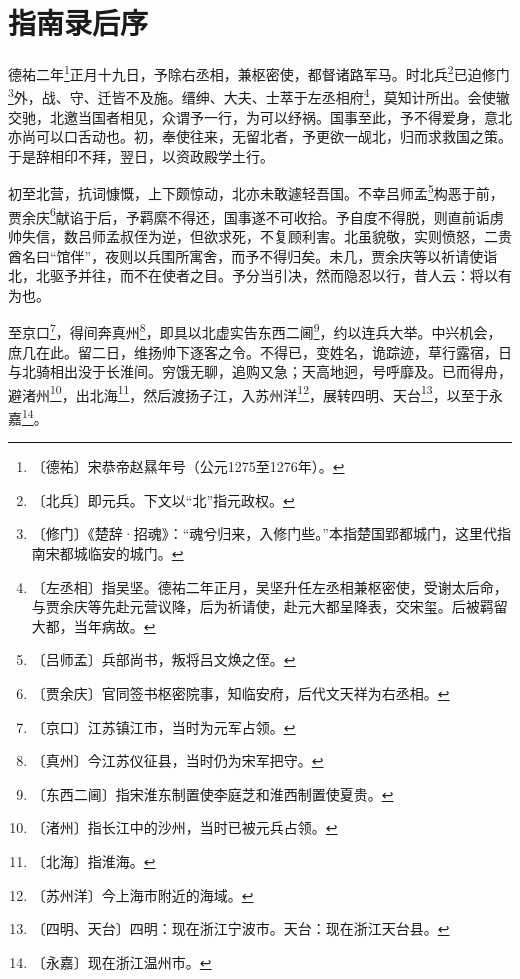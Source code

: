 \documentclass[12pt,UTF-8,openany]{ctexbook}
\begin{document}
\chapter{指南录后序}

\begin{normalsize}
    
    德祐二年\footnote{〔德祐〕宋恭帝赵㬎年号（公元1275至1276年）。}正月十九日，予除右丞相，兼枢密使，都督诸路军马。时北兵\footnote{〔北兵〕即元兵。下文以“北”指元政权。}已迫修门\footnote{〔修门〕《楚辞·招魂》：“魂兮归来，入修门些。”本指楚国郢都城门，这里代指南宋都城临安的城门。}外，战、守、迁皆不及施。缙绅、大夫、士萃于左丞相府\footnote{〔左丞相〕指吴坚。德祐二年正月，吴坚升任左丞相兼枢密使，受谢太后命，与贾余庆等先赴元营议降，后为祈请使，赴元大都呈降表，交宋玺。后被羁留大都，当年病故。}，莫知计所出。会使辙交驰，北邀当国者相见，众谓予一行，为可以纾祸。国事至此，予不得爱身，意北亦尚可以口舌动也。初，奉使往来，无留北者，予更欲一觇北，归而求救国之策。于是辞相印不拜，翌日，以资政殿学土行。
    
    初至北营，抗词慷慨，上下颇惊动，北亦未敢遽轻吾国。不幸吕师孟\footnote{〔吕师孟〕兵部尚书，叛将吕文焕之侄。}构恶于前，贾余庆\footnote{〔贾余庆〕官同签书枢密院事，知临安府，后代文天祥为右丞相。}献谄于后，予羁縻不得还，国事遂不可收拾。予自度不得脱，则直前诟虏帅失信，数吕师孟叔侄为逆，但欲求死，不复顾利害。北虽貌敬，实则愤怒，二贵酋名曰“馆伴”，夜则以兵围所寓舍，而予不得归矣。未几，贾余庆等以祈请使诣北，北驱予并往，而不在使者之目。予分当引决，然而隐忍以行，昔人云：将以有为也。
    
    至京口\footnote{〔京口〕江苏镇江市，当时为元军占领。}，得间奔真州\footnote{〔真州〕今江苏仪征县，当时仍为宋军把守。}，即具以北虚实告东西二阃\footnote{〔东西二阃〕指宋淮东制置使李庭芝和淮西制置使夏贵。}，约以连兵大举。中兴机会，庶几在此。留二日，维扬帅下逐客之令。不得已，变姓名，诡踪迹，草行露宿，日与北骑相出没于长淮间。穷饿无聊，追购又急；天高地迥，号呼靡及。已而得舟，避渚州\footnote{〔渚州〕指长江中的沙州，当时已被元兵占领。}，出北海\footnote{〔北海〕指淮海。}，然后渡扬子江，入苏州洋\footnote{〔苏州洋〕今上海市附近的海域。}，展转四明、天台\footnote{〔四明、天台〕四明：现在浙江宁波市。天台：现在浙江天台县。}，以至于永嘉\footnote{〔永嘉〕现在浙江温州市。}。
    

\end{normalsize}
\end{document}
